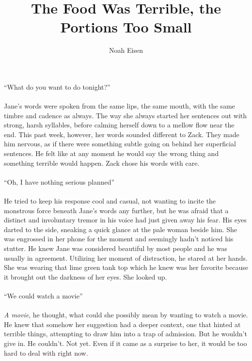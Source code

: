 \documentclass[12pt,oneside,openany]{memoir}
\begin{document}
\title{The Food Was Terrible, the Portions Too Small}
\author{Noah Eisen}
\date{}
\maketitle
\thispagestyle{empty}
\pagestyle{empty}
\noindent
“What do you want to do tonight?”
\\\\
Jane’s words were spoken from the same lips, the same mouth, with the same timbre and cadence as always. The way she always started her sentences out with strong, harsh syllables, before calming herself down to a mellow flow near the end.  This past week, however, her words sounded different to Zack. They made him nervous, as if there were something subtle going on behind her superficial sentences. He felt like at any moment he would say the wrong thing and something terrible would happen. Zack chose his words with care.
\\\\
“Oh, I have nothing serious planned”
\\\\
He tried to keep his response cool and casual, not wanting to incite the monstrous force beneath Jane’s words any further, but he was afraid that a distinct and involuntary tremor in his voice had just given away his fear. His eyes darted to the side, sneaking a quick glance at the pale woman beside him. She was engrossed in her phone for the moment and seemingly hadn’t noticed his stutter. He knew Jane was considered beautiful by most people and he was usually in agreement. Utilizing her moment of distraction, he stared at her hands. She was wearing that lime green tank top which he knew was her favorite because it brought out the darkness of her eyes. She looked up.
\\\\
“We could watch a movie”
\\\\
\textit{A movie}, he thought, what could she possibly mean by wanting to watch a movie. He knew that somehow her suggestion had a deeper context, one that hinted at terrible things, attempting to draw him into a trap of admission. But he wouldn’t give in. He couldn’t. Not yet. Even if it came as a surprise to her, it would be too hard to deal with right now. 
\\\\
\end{document}
